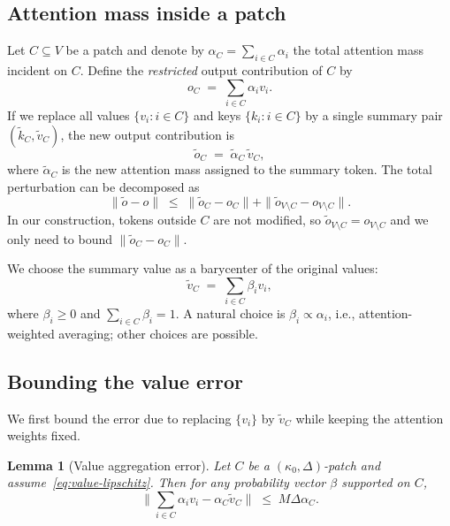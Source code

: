 \documentclass{article}
\theoremstyle{plain}
\newtheorem{lemma}{Lemma}
\theoremstyle{definition}
\theoremstyle{remark}
\begin{document}
\subsection{Attention mass inside a patch}

Let $C\subseteq V$ be a patch and denote by $\alpha_C = \sum_{i\in C} \alpha_i$ the total attention mass incident on $C$. Define the \emph{restricted} output contribution of $C$ by
\begin{equation}
  o_C \;=\; \sum_{i\in C} \alpha_i v_i.
\end{equation}
If we replace all values $\{v_i : i\in C\}$ and keys $\{k_i : i\in C\}$ by a single summary pair $(\tilde{k}_C,\tilde{v}_C)$, the new output contribution is
\begin{equation}
  \tilde{o}_C \;=\; \tilde{\alpha}_C\, \tilde{v}_C,
\end{equation}
where $\tilde{\alpha}_C$ is the new attention mass assigned to the summary token. The total perturbation can be decomposed as
\begin{equation}
  \|\tilde{o} - o\| \;\le\; \|\tilde{o}_C - o_C\| + \|\tilde{o}_{V\setminus C} - o_{V\setminus C}\|.
\end{equation}
In our construction, tokens outside $C$ are not modified, so $\tilde{o}_{V\setminus C} = o_{V\setminus C}$ and we only need to bound $\|\tilde{o}_C - o_C\|$.

We choose the summary value as a barycenter of the original values:
\begin{equation}
  \tilde{v}_C \;=\; \sum_{i\in C} \beta_i v_i,
\end{equation}
where $\beta_i \ge 0$ and $\sum_{i\in C} \beta_i = 1$. A natural choice is $\beta_i \propto \alpha_i$, i.e., attention-weighted averaging; other choices are possible.

\subsection{Bounding the value error}

We first bound the error due to replacing $\{v_i\}$ by $\tilde{v}_C$ while keeping the attention weights fixed.

\begin{lemma}[Value aggregation error]
\label{lem:value-error}
Let $C$ be a $(\kappa_0,\Delta)$-patch and assume~\eqref{eq:value-lipschitz}. Then for any probability vector $\beta$ supported on $C$,
\begin{equation}
  \bigg\|\sum_{i\in C} \alpha_i v_i - \alpha_C \tilde{v}_C\bigg\|
  \;\le\; M \Delta \alpha_C.
\end{equation}
\end{lemma}
\end{document}
